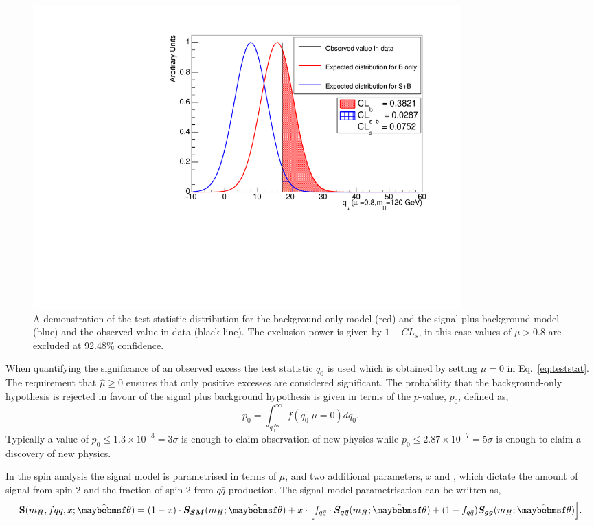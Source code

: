 \begin{figure}
  \begin{center}
    \includegraphics[width=0.8\textwidth]{analysis/plots/testStatDrawing.pdf}
    \caption[A demonstration of the test statistic distribution]{A demonstration of the test statistic distribution for the background only model (red) and the signal plus background model (blue) and the observed value in data (black line). The exclusion power is given by $1-CL_{s}$, in this case values of $\mu>0.8$ are excluded at 92.48\% confidence.}
    \label{fig:cls}
  \end{center}
\end{figure}

When quantifying the significance of an observed excess the test statistic $q_{0}$ is used which is obtained by setting $\mu=0$ in Eq.~\ref{eq:teststat}. The requirement that $\hat{\mu}\geq0$ ensures that only positive excesses are considered significant. The probability that the background-only hypothesis is rejected in favour of the signal plus background hypothesis is given in terms of the $p$-value, $p_{0}$, defined as,
\begin{equation}
  p_{0} = \int_{q_{0}^{obs}}^{\infty}f(q_{0}|\mu=0)dq_{0}.
  \label{eq:pvalue}
\end{equation}
Typically a value of $p_{0}\leq1.3\times10^{-3}=3\sigma$ is enough to claim observation of new physics while $p_{0}\leq2.87\times10^{-7}=5\sigma$ is enough to claim a discovery of new physics.

In the spin analysis the signal model is parametrised in terms of $\mu$, \mH and two additional parameters, $x$ and \fqqbar, which dictate the amount of signal from spin-2 and the fraction of spin-2 from $q\bar{q}$ production. The signal model parametrisation can be written as,
\begin{equation}
  \textbf{S}(m_{H},fqq,x;\hat{\theta}) = (1-x)\cdot\boldsymbol{S_{SM}}(m_{H};\hat{\theta})  + x\cdot\Bigl[f_{q\bar{q}}\cdot \boldsymbol{S_{q\bar{q}}}(m_{H};\hat{\theta}) + (1-f_{q\bar{q}})\boldsymbol{S_{gg}}(m_{H};\hat{\theta})\Bigr].  
  \label{eq:spin_sig}
\end{equation}

